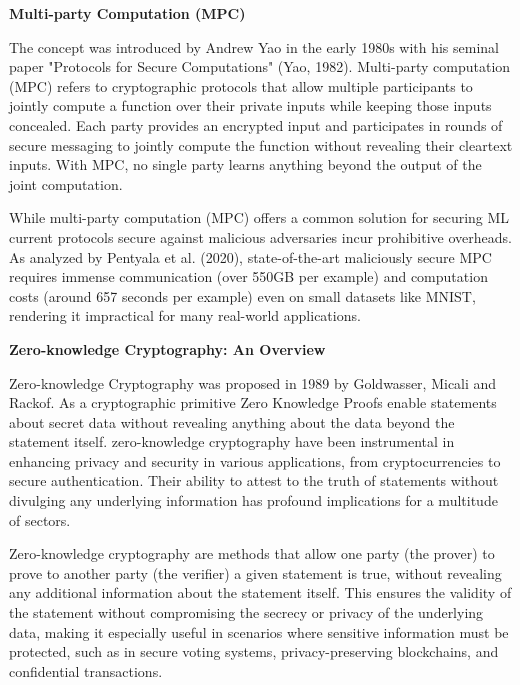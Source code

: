 \documentclass[conference]{IEEEtran}
\begin{document}
\noindent \textbf{Multi-party Computation (MPC)}

The concept was introduced by Andrew Yao in the early 1980s with his seminal paper "Protocols for Secure Computations" (Yao, 1982). Multi-party computation (MPC) refers to cryptographic protocols that allow multiple participants to jointly compute a function over their private inputs while keeping those inputs concealed.   Each party provides an encrypted input and participates in rounds of secure messaging to jointly compute the function without revealing their cleartext inputs. With MPC, no single party learns anything beyond the output of the joint computation.

While multi-party computation (MPC) offers a common solution for securing ML current protocols secure against malicious adversaries incur prohibitive overheads. As analyzed by Pentyala et al. (2020), state-of-the-art maliciously secure MPC requires immense communication (over 550GB per example) and computation costs (around 657 seconds per example) even on small datasets like MNIST, rendering it impractical for many real-world applications.  

\noindent \textbf{Zero-knowledge Cryptography: An Overview}

Zero-knowledge Cryptography was proposed in 1989 by Goldwasser, Micali and Rackof. As a cryptographic primitive Zero Knowledge Proofs enable statements about secret data without revealing anything about the data beyond the statement itself.  zero-knowledge cryptography have been instrumental in enhancing privacy and security in various applications, from cryptocurrencies to secure authentication. Their ability to attest to the truth of statements without divulging any underlying information has profound implications for a multitude of sectors.

Zero-knowledge cryptography are methods that allow one party (the prover) to prove to another party (the verifier) a given statement is true, without revealing any additional information about the statement itself. This ensures the validity of the statement without compromising the secrecy or privacy of the underlying data, making it especially useful in scenarios where sensitive information must be protected, such as in secure voting systems, privacy-preserving blockchains, and confidential transactions.
\end{document}
